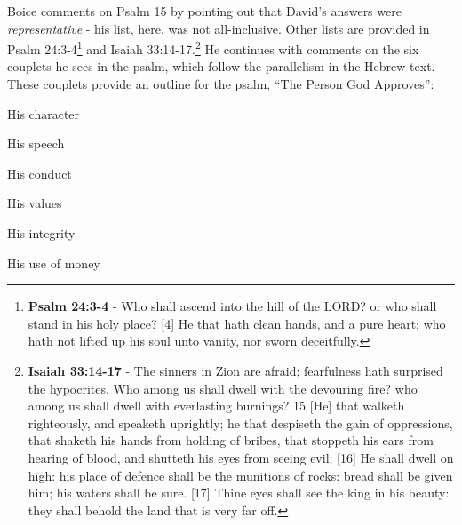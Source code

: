 \noindent Boice comments on Psalm 15 by pointing out that David's answers were \emph{representative} - his list, here, was not all-inclusive. Other lists are provided in Psalm 24:3-4\footnote{\textbf{Psalm 24:3-4} - Who shall ascend into the hill of the LORD? or who shall stand in his holy place? [4] He that hath clean hands, and a pure heart; who hath not lifted up his soul unto vanity, nor sworn deceitfully.} and Isaiah 33:14-17.\footnote{\textbf{Isaiah 33:14-17} - The sinners in Zion are afraid; fearfulness hath surprised the hypocrites. Who among us shall dwell with the devouring fire? who among us shall dwell with everlasting burnings? 15 [He] that walketh righteously, and speaketh uprightly; he that despiseth the gain of oppressions, that shaketh his hands from holding of bribes, that stoppeth his ears from hearing of blood, and shutteth his eyes from seeing evil; [16] He shall dwell on high: his place of defence shall be the munitions of rocks: bread shall be given him; his waters shall be sure. [17] Thine eyes shall see the king in his beauty: they shall behold the land that is very far off.}\cite{boice2005psalmsV1} He continues with comments on the six couplets he sees in the psalm, which follow the parallelism in the Hebrew text. These couplets provide an outline for the psalm, ``The Person God Approves'':\\

\begin{compactenum}[I.]
    \item His character 
    \item His speech
    \item His conduct
    \item His values
    \item His integrity
    \item His use of money\\

\end{compactenum}

